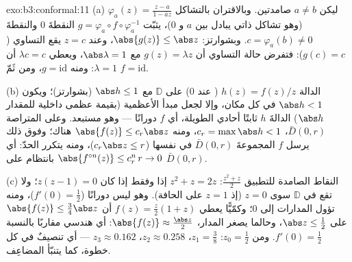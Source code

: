 \begin{solution}{exo:b3:conformal:11}
(a) ليكن $a \neq b$ صامدتين. وبالاقتران بالتشاكل $\varphi_a(z) =
\frac{z - a}{1 - \bar az}$ (وهو تشاكل
ذاتي يبادل بين $a$ و $0$)، يثبّت $g = \varphi_a\circ f\circ\varphi_a^{-1}$ النقطةَ $0$ والنقطةَ
$c = \varphi_a(b) \neq 0$. وبشوارتز: $\abs{g(z)} \leq \abs z$، وعند $z = c$ يقع التساوي
($g(c) = c$): فتفرض حالة التساوي أن $g(z) = \lambda z$ مع $\abs\lambda = 1$، ويعطي
$\lambda c = c$ أن $\lambda =
1$: ومنه $g = \mathrm{id}$، ومن ثَمّ $f = \mathrm{id}$.

(b) الدالة $h(z) = f(z)/z$ ( عند $0$)
 على $\mathbb D$ مع $\abs h \leq 1$ (بشوارتز)؛ ويكون
$\abs h < 1$ في كل مكان، وإلا لجعل مبدأ الأعظمية (بقيمة عظمى
داخلية للمقدار $\abs h$) الدالةَ $h$ ثابتًا أحادي الطويلة، أي
$f$ دورانًا --- وهو مستبعد. وعلى المتراصة $\bar D(0,r)$، $c_r = \max\abs h < 1$،
ومنه $\abs{f(z)} \leq
c_r\abs z$ هناك؛ وفوق ذلك يرسل $f$ المجموعةَ $\bar D(0,r)$
في نفسها ($c_r\abs z \leq r$)، ومنه يتكرر الحدّ: أي $\abs{f^{\circ n}(z)} \leq c_r^n\,r \to 0$ بانتظام على
$\bar D(0, r)$.

(c) النقاط الصامدة للتطبيق $\frac{z^2 + z}2$: $z^2 + z = 2z$ إذا وفقط إذا
كان $z(z - 1) = 0$؛ ولا تقع في $\mathbb D$ سوى $z = 0$ (إذ
$z = 1$ على الحافة). وهو ليس دورانًا ($f'(0) = \frac12$)، ومنه تؤول
المدارات إلى $0$؛ وكمّيًّا يعطي $f(z) = \frac z2(1 + z)$ أن $\abs{f(z)} \leq \frac{3}{4}\abs z$ على $\abs z \leq
\frac12$،
وحالما يصغر المدار، $\abs{f(z)} \approx
\frac{\abs z}2$: أي هندسي مقاربًا بالنسبة $f'(0) = \frac12$.
ومن $z_0 = \frac12$: $z_1 = \frac38$، $z_2 \approx 0.258$، $z_3 \approx 0.162$ --- أي
تنصيفٌ في كل خطوة، كما يتنبّأ المضاعِف.
\end{solution}

